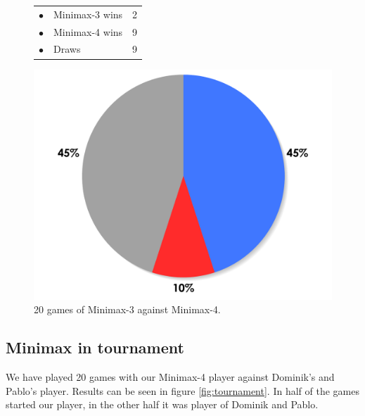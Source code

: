 \documentclass[paper=a4, fontsize=11pt]{article} %
\newcommand{\ra}[1]{\renewcommand{\arraystretch}{#1}}
\begin{document}
\begin{figure}[ht]
    \begin{minipage}[c]{0.40\linewidth}
        \centering
        \ra{1.3}
        \begin{tabular}{cll}
            \toprule
            \textcolor{red!100}{$\bullet$} & Minimax-3 wins & 2       \\
            \textcolor{blue!100!yellow!100!red!80}{$\bullet$} & Minimax-4 wins & 9      \\  
            \textcolor{gray!100}{$\bullet$} & Draws & 9      \\  
            \bottomrule
        \end{tabular}
    \end{minipage}
    \begin{minipage}[c]{0.60\linewidth}
        \centering
        \includegraphics[scale=0.35]{img/minimax3-minimax4.pdf}
    \end{minipage}
    \caption{20 games of Minimax-3 against Minimax-4.}
    \label{fig:minimax3-minimax4}
\end{figure}

\subsection{Minimax in tournament}
We have played 20 games with our Minimax-4 player against Dominik's and Pablo's player.
Results can be seen in figure \ref{fig:tournament}.
In half of the games started our player, in the other half it was player of Dominik and Pablo.
\end{document}
